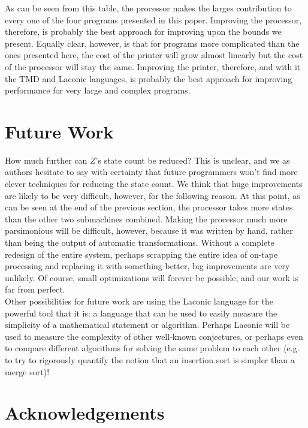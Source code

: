 \documentclass[11pt]{article}
\begin{document}
As can be seen from this table, the processor makes the larges contribution to every one of the four programs presented in this paper. Improving the processor, therefore, is probably the best approach for improving upon the bounds we present. Equally clear, however, is that for programs more complicated than the ones presented here, the cost of the printer will grow almost linearly but the cost of the processor will stay the same. Improving the printer, therefore, and with it the TMD and Laconic languages, is probably the best approach for improving performance for very large and complex programs.

\section{Future Work}

How much further can $Z$'s state count be reduced? This is unclear, and we as authors hesitate to say with certainty that future programmers won't find more clever techniques for reducing the state count. We think that huge improvements are likely to be very difficult, however, for the following reason. At this point, as can be seen at the end of the previous section, the processor takes more states than the other two submachines combined. Making the processor much more parsimonious will be difficult, however, because it was written by hand, rather than being the output of automatic transformations. Without a complete redesign of the entire system, perhaps scrapping the entire idea of on-tape processing and replacing it with something better, big improvements are very unlikely. Of course, small optimizations will forever be possible, and our work is far from perfect. \\

Other possibilities for future work are using the Laconic language for the powerful tool that it is: a language that can be used to easily measure the simplicity of a mathematical statement or algorithm. Perhaps Laconic will be used to measure the complexity of other well-known conjectures, or perhaps even to compare different algorithms for solving the same problem to each other (e.g. to try to rigorously quantify the notion that an insertion sort is simpler than a merge sort)!

\section{Acknowledgements}

\end{document}
